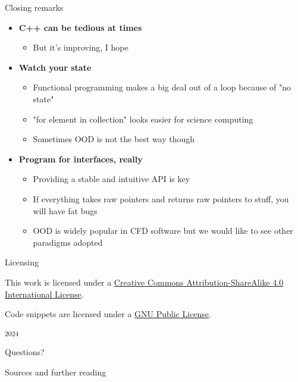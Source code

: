 \begin{frame}[fragile]{Closing remarks}

    \begin{itemize}
        \item \textbf{C++ can be tedious at times}
        \begin{itemize}
            \item But it's improving, I hope
        \end{itemize}
        \item \textbf{Watch your state}
        \begin{itemize}
            \item Functional programming makes a big deal out of a loop because of "no state"
            \item "for element in collection" looks easier for science computing
            \item Sometimes OOD is not the best way though
        \end{itemize}
        \item \textbf{Program for interfaces, really}
        \begin{itemize}
            \item Providing a stable and intuitive API is key
            \item If everything takes raw pointers and returns raw pointers to stuff, you will have fat bugs
            \item OOD is widely popular in CFD software but we would like to see other paradigms adopted
        \end{itemize}
    \end{itemize}

\end{frame}

\begin{frame}{Licensing}

    This work is licensed under a
    \href{http://creativecommons.org/licenses/by-sa/4.0/}{Creative Commons
    Attribution-ShareAlike 4.0 International License}.

    Code snippets are licensed under a \href{http://www.gnu.org/licenses/gpl.txt}{GNU Public License}.

    \begin{center}\ccbysa \hspace{2mm} \textsuperscript{2024}\end{center}

\end{frame}

\begin{frame}[standout]
  Questions?
\end{frame}

\appendix

\begin{frame}[allowframebreaks]{Sources and further reading}
\printbibliography[heading=none]
\end{frame}
